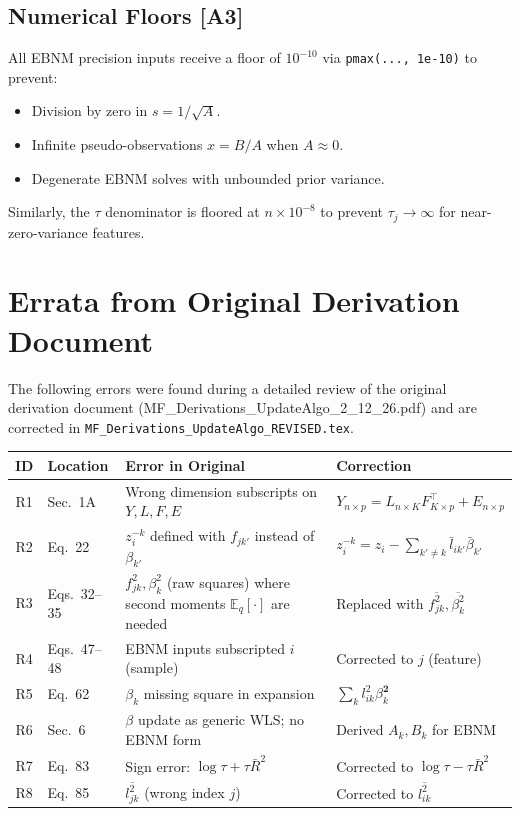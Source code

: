\documentclass[11pt]{article}
\newcommand{\lbar}[2]{\bar{l}_{#1#2}}
\newcommand{\betabar}[1]{\bar{\beta}_{#1}}
\newcommand{\lsec}[2]{\overline{l^2_{#1#2}}}
\newcommand{\fsec}[2]{\overline{f^2_{#1#2}}}
\newcommand{\betasec}[1]{\overline{\beta^2_{#1}}}
\newcommand{\coderef}[1]{{\color{blue!70!black}\texttt{#1}}}
\begin{document}
\subsection{Numerical Floors [A3]}

All EBNM precision inputs receive a floor of $10^{-10}$ via
\coderef{pmax(..., 1e-10)} to prevent:
\begin{itemize}[noitemsep]
\item Division by zero in $s = 1/\sqrt{A}$.
\item Infinite pseudo-observations $x = B/A$ when $A \approx 0$.
\item Degenerate EBNM solves with unbounded prior variance.
\end{itemize}

Similarly, the $\tau$ denominator is floored at $n \times 10^{-8}$ to prevent
$\tau_j \to \infty$ for near-zero-variance features.

\appendix
\section{Errata from Original Derivation Document}\label{sec:errata}

The following errors were found during a detailed review of the original
derivation document (MF\_Derivations\_UpdateAlgo\_2\_12\_26.pdf) and are
corrected in \texttt{MF\_Derivations\_UpdateAlgo\_REVISED.tex}.

\begin{center}
\small
\begin{tabular}{clp{5cm}p{5cm}}
\toprule
\textbf{ID} & \textbf{Location} & \textbf{Error in Original} & \textbf{Correction} \\
\midrule
R1 & Sec.~1A & Wrong dimension subscripts on $Y,L,F,E$ &
     $Y_{n\times p} = L_{n\times K}F^{\top}_{K\times p} + E_{n\times p}$ \\
R2 & Eq.~22 & $z^{-k}_i$ defined with $f_{jk'}$ instead of $\beta_{k'}$ &
     $z^{-k}_i = z_i - \sum_{k'\neq k}\lbar{i}{k'}\betabar{k'}$ \\
R3 & Eqs.~32--35 & $f^2_{jk}, \beta^2_k$ (raw squares) where second
     moments $\mathbb{E}_q[\cdot]$ are needed &
     Replaced with $\fsec{j}{k}, \betasec{k}$ \\
R4 & Eqs.~47--48 & EBNM inputs subscripted $i$ (sample) &
     Corrected to $j$ (feature) \\
R5 & Eq.~62 & $\beta_k$ missing square in expansion &
     $\sum_k l_{ik}^2 \beta_k^{\mathbf{2}}$ \\
R6 & Sec.~6 & $\beta$ update as generic WLS; no EBNM form &
     Derived $A_k, B_k$ for EBNM \\
R7 & Eq.~83 & Sign error: $\log\tau + \tau\bar{R}^2$ &
     Corrected to $\log\tau - \tau\bar{R}^2$ \\
R8 & Eq.~85 & $\overline{l^2_{jk}}$ (wrong index $j$) &
     Corrected to $\lsec{i}{k}$ \\
\bottomrule
\end{tabular}
\end{center}
\end{document}

